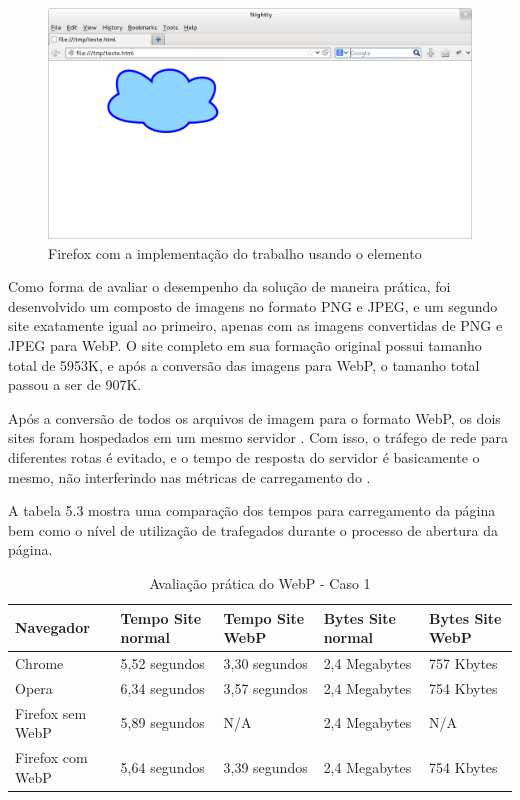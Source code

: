 \documentclass[espaco=simples,appendix=Name]{abnt}
\begin{document}
\begin{figure}[h]
  \centering
    \includegraphics[scale=0.3]{HTML5CanvasFirefoxWebP.png}
  \caption{Firefox com a implementação do trabalho usando o elemento }
\end{figure}

Como forma de avaliar o desempenho da solução de maneira prática, foi desenvolvido um  composto de imagens no formato PNG e JPEG, e um segundo site exatamente igual ao primeiro, apenas com as imagens convertidas de PNG e JPEG para WebP. O site completo em sua formação original possui tamanho total de 5953K, e após a conversão das imagens para WebP, o tamanho total passou a ser de 907K. 

Após a conversão de todos os arquivos de imagem para o formato WebP, os dois sites foram hospedados em um mesmo servidor . Com isso, o tráfego de rede para diferentes rotas é evitado, e o tempo de resposta do servidor é basicamente o mesmo, não interferindo nas métricas de carregamento do . 

A tabela 5.3 mostra uma comparação dos tempos para carregamento da página bem como o nível de utilização de  trafegados durante o processo de abertura da página.

\begin{table}[ht]
        \centering
        \caption{Avaliação prática do WebP - Caso 1
        \label{tbl:padc}}{
                \begin{tabular}{|l|p{3cm}|p{3cm}|l|p{2cm}|}
                \hline
                        \textbf{Navegador} & \textbf{Tempo Site normal} & \textbf{Tempo Site WebP} & \textbf{Bytes Site normal} & \textbf{Bytes Site WebP} \\
                        \hline
                        Chrome			&  5,52 segundos	& 3,30 segundos		& 2,4 Megabytes		& 757 Kbytes \\
                        \hline
						Opera			&  6,34 segundos	& 3,57 segundos		& 2,4 Megabytes		& 754 Kbytes \\
						\hline
                        Firefox sem WebP	&  5,89 segundos	& N/A			& 2,4 Megabytes		& N/A \\
                        \hline
                        Firefox com WebP	&  5,64 segundos	& 3,39 segundos		& 2,4 Megabytes		& 754 Kbytes \\
                        \hline
                \end{tabular}
                }
\end{table}
\end{document}
